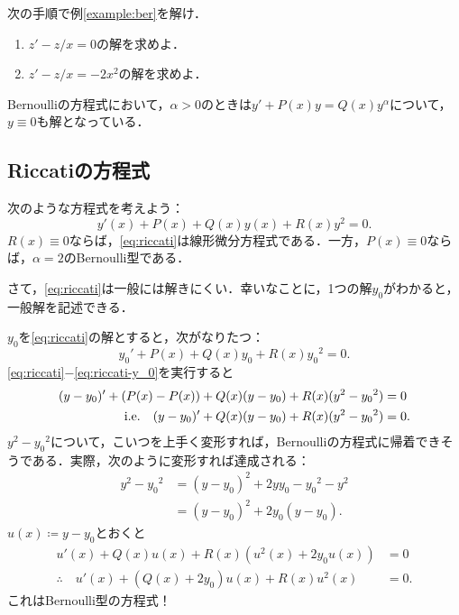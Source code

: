 \begin{homework*}[任意]
    次の手順で例\ref{example:ber}を解け．
    \begin{enumerate}
        \item $z'-z/x= 0$の解を求めよ．
        \item $z'-z/x = -2x^2$の解を求めよ．
    \end{enumerate}
\end{homework*}

\begin{remark}
    Bernoulliの方程式において，$\alpha>0$のときは$y'+P(x)y=Q(x)y^{\alpha}$について，$y \equiv 0$も解となっている．
\end{remark}

\subsection{Riccatiの方程式}
次のような方程式を考えよう：
\begin{equation}
    y'(x) + P(x) + Q(x)y(x) + R(x)y^2 = 0. \label{eq:riccati}
\end{equation}
$R(x) \equiv 0$ならば，\eqref{eq:riccati}は線形微分方程式である．一方，$P(x) \equiv 0$ならば，$\alpha=2$のBernoulli型である．

さて，\eqref{eq:riccati}は一般には解きにくい．幸いなことに，1つの解$y_0$がわかると，一般解を記述できる．

$y_0$を\eqref{eq:riccati}の解とすると，次がなりたつ：
\[ {y_0}' + P(x) + Q(x)y_0 + R(x){y_0}^2 = 0. \label{eq:riccati-y_0} \]
\eqref{eq:riccati}$-$\eqref{eq:riccati-y_0}を実行すると
\begin{align*}
    (y-y_0)' + (P(x)-P(x)) + Q(x)(y-y_0) + R(x)(y^2-{y_0}^2) &= 0 \\
    \text{i.e.} \quad (y-y_0)' + Q(x)(y-y_0) + R(x)(y^2-{y_0}^2) &= 0.
\end{align*}
$y^2-{y_0}^2$について，こいつを上手く変形すれば，Bernoulliの方程式に帰着できそうである．実際，次のように変形すれば達成される：
\begin{align*}
    y^2-{y_0}^2 &= (y-y_0)^2 + 2yy_0 - {y_0}^2-y^2 \\
    &= (y-y_0)^2 +  2y_0(y-y_0).
\end{align*}
$u(x) \coloneqq y-y_0$とおくと
\begin{align*}
    u'(x) + Q(x)u(x) + R(x)(u^2(x)+2y_0u(x)) &= 0 \\
    \therefore \quad u'(x) + (Q(x)+2y_0)u(x) + R(x)u^2(x) &= 0.
\end{align*}
これはBernoulli型の方程式！

